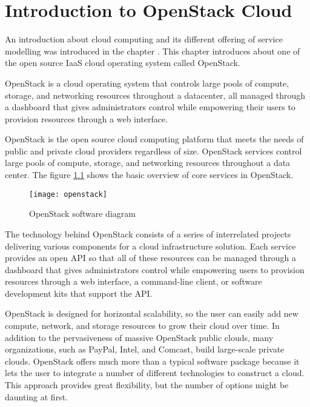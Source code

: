 
\chapter{Introduction to OpenStack Cloud\cite{OpenStack}}\label{ch:introduction_openstack}
\sffamily{}
An introduction about cloud computing and its different offering of service modelling was introduced in the chapter . This chapter  introduces about one of the open source IaaS cloud operating system called OpenStack.

OpenStack is a cloud operating system that controls large pools of compute, storage, and networking resources throughout a datacenter, all managed through a dashboard that gives administrators control while empowering their users to provision resources through a web interface.

OpenStack is the open source cloud computing platform that meets the needs of public and private cloud providers regardless of size. OpenStack services control large pools of compute, storage, and networking resources throughout a data center. The figure \ref{fig:openstack} shows the basic overview of core services in OpenStack.

\begin{figure}[H]
  \centering
  \texttt{[image: openstack]}
  \caption{OpenStack software diagram\cite{OpenStack:software}}
  \label{fig:openstack}
\end{figure}

The technology behind OpenStack consists of a series of interrelated projects delivering various components for a cloud infrastructure solution. Each service provides an open API so that all of these resources can be managed through a dashboard that gives administrators control while empowering users to provision resources through a web interface, a command-line client, or software development kits that support the API.

OpenStack is designed for horizontal scalability, so the user can easily add new compute, network, and storage resources to grow their cloud over time. In addition to the pervasiveness of massive OpenStack public clouds, many organizations, such as PayPal, Intel, and Comcast, build large-scale private clouds. OpenStack offers much more than a typical software package because it lets the user to integrate a number of different technologies to construct a cloud. This approach provides great flexibility, but the number of options might be daunting at first.

